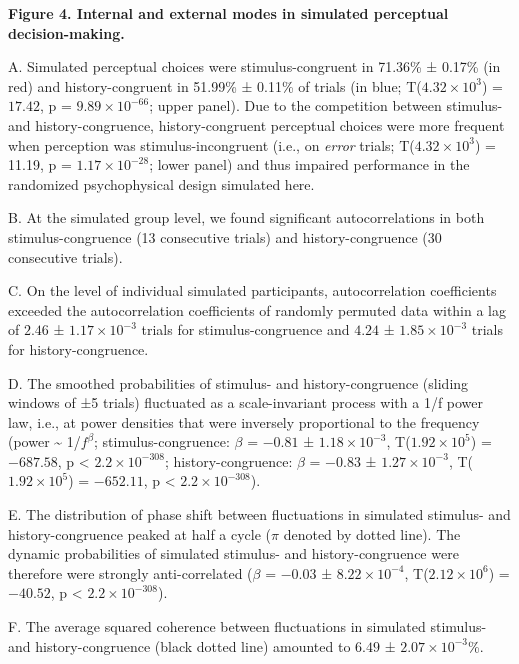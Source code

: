 \documentclass[
]{article}
\begin{document}
\textbf{Figure 4. Internal and external modes in simulated perceptual
decision-making.}

A. Simulated perceptual choices were stimulus-congruent in 71.36\% ±
0.17\% (in red) and history-congruent in 51.99\% ± 0.11\% of trials (in
blue; T(\(\ensuremath{4.32\times 10^{3}}\)) = \(17.42\), p =
\(\ensuremath{9.89\times 10^{-66}}\); upper panel). Due to the
competition between stimulus- and history-congruence, history-congruent
perceptual choices were more frequent when perception was
stimulus-incongruent (i.e., on \emph{error} trials;
T(\ensuremath{4.32\times 10^{3}}) = 11.19, p =
\(\ensuremath{1.17\times 10^{-28}}\); lower panel) and thus impaired
performance in the randomized psychophysical design simulated here.

B. At the simulated group level, we found significant autocorrelations
in both stimulus-congruence (13 consecutive trials) and
history-congruence (30 consecutive trials).

C. On the level of individual simulated participants, autocorrelation
coefficients exceeded the autocorrelation coefficients of randomly
permuted data within a lag of \(2.46\) ±
\(\ensuremath{1.17\times 10^{-3}}\) trials for stimulus-congruence and
\(4.24\) ± \(\ensuremath{1.85\times 10^{-3}}\) trials for
history-congruence.

D. The smoothed probabilities of stimulus- and history-congruence
(sliding windows of ±5 trials) fluctuated as a scale-invariant process
with a 1/f power law, i.e., at power densities that were inversely
proportional to the frequency (power \textasciitilde{} 1/\(f^\beta\);
stimulus-congruence: \(\beta\) = \(-0.81\) ±
\(\ensuremath{1.18\times 10^{-3}}\),
T(\(\ensuremath{1.92\times 10^{5}}\)) = \(-687.58\), p < \(\ensuremath{2.2\times 10^{-308}}\);
history-congruence: \(\beta\) = \(-0.83\) ±
\(\ensuremath{1.27\times 10^{-3}}\),
T(\(\ensuremath{1.92\times 10^{5}}\)) = \(-652.11\), p < \(\ensuremath{2.2\times 10^{-308}}\)).

E. The distribution of phase shift between fluctuations in simulated
stimulus- and history-congruence peaked at half a cycle (\(\pi\) denoted
by dotted line). The dynamic probabilities of simulated stimulus- and
history-congruence were therefore were strongly anti-correlated
(\(\beta\) = \(-0.03\) ± \(\ensuremath{8.22\times 10^{-4}}\),
T(\(\ensuremath{2.12\times 10^{6}}\)) = \(-40.52\), p < \(\ensuremath{2.2\times 10^{-308}}\)).

F. The average squared coherence between fluctuations in simulated
stimulus- and history-congruence (black dotted line) amounted to
\(6.49\) ± \(\ensuremath{2.07\times 10^{-3}}\)\%.
\end{document}
